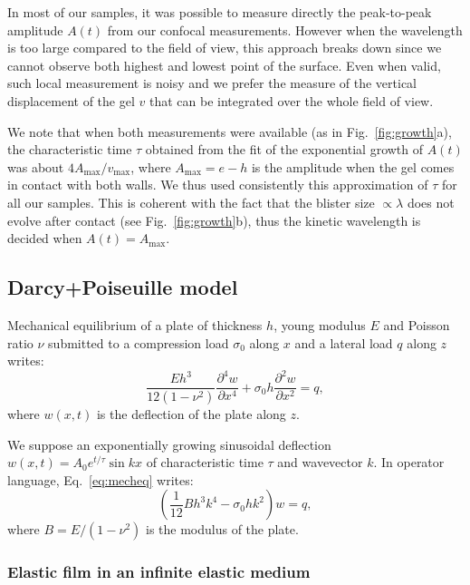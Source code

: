 \documentclass[twocolumn,superscriptaddress,showpacs,preprintnumbers,
amsmath,amssymb,prl]{revtex4-1}
\begin{document}
In most of our samples, it was possible to measure directly the peak-to-peak amplitude $A(t)$ from our confocal measurements. However when the wavelength is too large compared to the field of view, this approach breaks down since we cannot observe both highest and lowest point of the surface. Even when valid, such local measurement is noisy and we prefer the measure of the vertical displacement of the gel $v$ that can be integrated over the whole field of view.

We note that when both measurements were available (as in Fig.~\ref{fig:growth}a), the characteristic time $\tau$ obtained from the fit of the exponential growth of $A(t)$ was about $4A_\text{max}/v_\text{max}$, where $A_\text{max} = e-h$ is the amplitude when the gel comes in contact with both walls. We thus used consistently this approximation of $\tau$ for all our samples. This is coherent with the fact that the blister size $\propto\lambda$ does not evolve after contact (see Fig.~\ref{fig:growth}b), thus the kinetic wavelength is decided when $A(t) = A_\text{max}$.

\subsection*{Darcy+Poiseuille model}

Mechanical equilibrium of a plate of thickness $h$, young modulus $E$ and Poisson ratio $\nu$ submitted to a compression load $\sigma_0$ along $x$ and a lateral load $q$ along $z$ writes:
\begin{equation}
\frac{E h^3}{12(1-\nu^2)}\frac{\partial^4 w}{\partial x^4} + \sigma_0 h \frac{\partial^2 w}{\partial x^2} = q,
\label{eq:mecheq}
\end{equation}
where $w(x,t)$ is the deflection of the plate along $z$.

We suppose an exponentially growing sinusoidal deflection $w(x,t) =  A_0 e^{t/\tau} \sin kx$ of characteristic time $\tau$ and wavevector $k$. In operator language, Eq.~\ref{eq:mecheq} writes:
\begin{equation}
\left(\frac{1}{12} B h^3 k^4 - \sigma_0 h k^2\right)w = q,
\label{eq:mecheqop}
\end{equation}
where $B=E/(1-\nu^2)$ is the modulus of the plate.

\subsubsection*{Elastic film in an infinite elastic medium}
\end{document}
